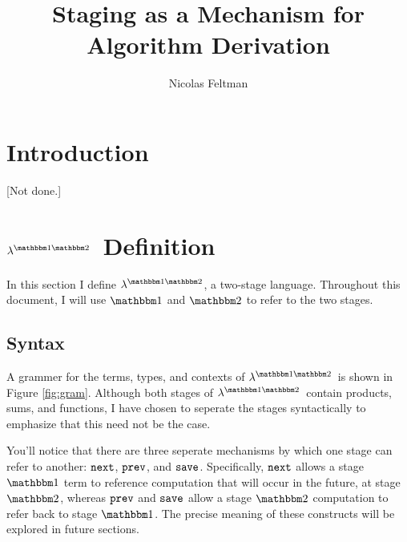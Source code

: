 \documentclass[11pt]{article}
\title{\Large\textbf{Staging as a Mechanism for Algorithm Derivation}}
\author{Nicolas Feltman}
\newcommand {\bbone} {\mathbbm 1}
\newcommand {\bbtwo} {\mathbbm 2}
\newcommand {\pause} {{\tt save}}
\newcommand {\next} {{\tt next}}
\newcommand {\prev} {{\tt prev}}
\newcommand {\lang} {$\lambda^{\bbone\bbtwo}$}
\begin{document}
\maketitle

\section{Introduction}

[Not done.]

\section{\lang~Definition}
\label{sec:def}

In this section I define \lang, a two-stage language.  Throughout this document, I will use $\bbone$ and $\bbtwo$ to refer to the two stages.  

\subsection{Syntax}

A grammer for the terms, types, and contexts of \lang\ is shown in Figure \ref{fig:gram}.  Although both stages of \lang\ contain products, sums, and functions, I have chosen to seperate the stages syntactically to emphasize that this need not be the case.

You'll notice that there are three seperate mechanisms by which one stage can refer to another: $\next$, $\prev$, and $\pause$.  Specifically, $\next$ allows a stage $\bbone$ term to reference computation that will occur in the future, at stage $\bbtwo$, whereas $\prev$ and $\pause$ allow a stage $\bbtwo$ computation to refer back to stage $\bbone$.  The precise meaning of these constructs will be explored in future sections.
\end{document}
